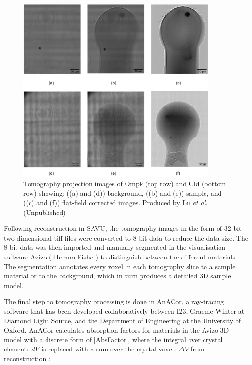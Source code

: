 \begin{figure}
    \centering
    \includegraphics[width = 0.9\textwidth]{images/Tomo projection images CLD and Ompk high quality.png}
    \caption{Tomography projection images of Ompk (top row) and Cld (bottom row) showing: ((a) and (d)) background,  ((b) and (e)) sample, and ((c) and (f)) flat-field corrected images. Produced by Lu \textit{et al.} (Unpublished) \cite{LuSubmitted}}
    \label{fig:tomo projections}
\end{figure}

Following reconstruction in SAVU, the tomography images in the form of 32-bit two-dimensional tiff files were converted to 8-bit data to reduce the data size. The 8-bit data was then imported and manually segmented in the visualisation software Avizo (Thermo Fisher) to distinguish between the different materials. The segmentation annotates every voxel in each tomography slice to a sample material or to the background, which in turn produces a detailed 3D sample model.


The final step to tomography processing is done in AnACor, a ray-tracing software that has been developed collaboratively between I23, Graeme Winter at Diamond Light Source, and the Department of Engineering at the University of Oxford. AnACor calculates absorption factors for materials in the Avizo 3D model with a discrete form of \cref{AbsFactor}, where the integral over crystal elements $dV$ is replaced with a sum over the crystal voxels $\Delta V$ from  reconstruction \cite{LuSubmitted}: %

